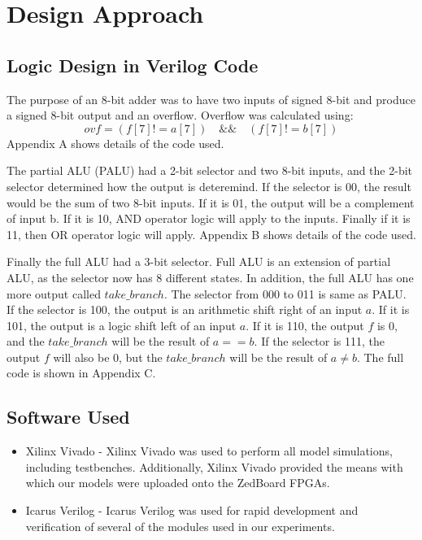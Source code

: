 \documentclass[12pt, letterpaper]{article}
\begin{document}
\newpage
\section{Design Approach}


\subsection{Logic Design in Verilog Code}


The purpose of an 8-bit adder was to have two inputs of signed 8-bit and produce a signed 8-bit output and an overflow. Overflow was calculated using:
\begin{equation}
  ovf = (f[7] != a[7]) \quad\&\&\quad (f[7] != b[7])
\end{equation}
Appendix A shows details of the code used.

The partial ALU (PALU) had a 2-bit selector and two 8-bit inputs, and the 2-bit selector determined how the output is deteremind. If the selector is 00, the result would be the sum of two 8-bit inputs. If it is 01, the output will be a complement of input b. If it is 10, AND operator logic will apply to the inputs. Finally if it is 11, then OR operator logic will apply. Appendix B shows details of the code used.

Finally the full ALU had a 3-bit selector. Full ALU is an extension of partial ALU, as the selector now has 8 different states. In addition, the full ALU has one more output called $take\_branch$. The selector from 000 to 011 is same as PALU. If the selector is 100, the output is an arithmetic shift right of an input $a$. If it is 101, the output is a logic shift left of an input $a$. If it is 110, the output $f$ is 0, and the $take\_branch$ will be the result of $a == b$. If the selector is 111, the output $f$ will also be 0, but the $take\_branch$ will be the result of $a \neq b$. The full code is shown in Appendix C.

\subsection{Software Used}
\begin{itemize}
	\item Xilinx Vivado - Xilinx Vivado was used to perform all model simulations, including testbenches.  Additionally, Xilinx Vivado provided the means with which our models were uploaded onto the ZedBoard FPGAs.
	\item Icarus Verilog - Icarus Verilog was used for rapid development and verification of several of the modules used in our experiments.

\end{itemize}
\newpage
\end{document}
